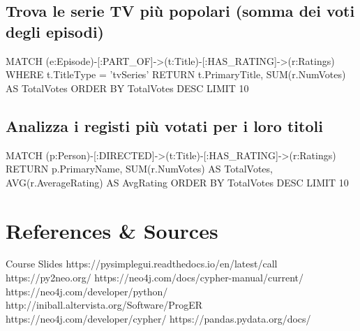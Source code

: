\documentclass[a4paper,12pt]{article}
\begin{document}
\subsection{Trova le serie TV più popolari (somma dei voti degli episodi)}
MATCH (e:Episode)-[:PART_OF]->(t:Title)-[:HAS_RATING]->(r:Ratings)
WHERE t.TitleType = 'tvSeries'
RETURN t.PrimaryTitle, SUM(r.NumVotes) AS TotalVotes
ORDER BY TotalVotes DESC
LIMIT 10

\subsection{Analizza i registi più votati per i loro titoli}
MATCH (p:Person)-[:DIRECTED]->(t:Title)-[:HAS_RATING]->(r:Ratings)
RETURN p.PrimaryName, SUM(r.NumVotes) AS TotalVotes, AVG(r.AverageRating) AS AvgRating
ORDER BY TotalVotes DESC
LIMIT 10




\newpage
\section{References \& Sources}
  \begin{thebibliography}{9}
    \bibitem{} Course Slides
    \bibitem{} https://pysimplegui.readthedocs.io/en/latest/call%
    \bibitem{} https://py2neo.org/
    \bibitem{} https://neo4j.com/docs/cypher-manual/current/
    \bibitem{} https://neo4j.com/developer/python/
    \bibitem{} http://iniball.altervista.org/Software/ProgER
    \bibitem{} https://neo4j.com/developer/cypher/
    \bibitem{} https://pandas.pydata.org/docs/
  \end{thebibliography}
\end{document}
